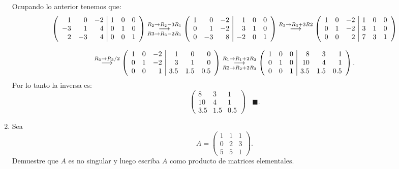 \documentclass[11pt,letterpaper]{article}
\newcommand{\finf}{\blacksquare.}
\newcommand{\grstep}[2][\relax]{%
   \ensuremath{\mathrel{
       {\mathop{\longrightarrow}\limits^{#2\mathstrut}_{
                                     \begin{subarray}{l} #1 \end{subarray}}}}}}
\begin{document}
\begin{enumerate}
Ocupando lo anterior tenemos que:
\begin{equation*}
\begin{array}{c}
\left(\begin{array}{rrr|rrr}
 1 &  0 & -2 & 1 & 0 & 0 \\
-3 &  1 &  4 & 0 & 1 & 0\\
 2 & -3 &  4 & 0 & 0 & 1
\end{array}\right)%
\grstep[R3 \rightarrow R_3 -2R_1]{R_2 \rightarrow R_2 -3R_1}
%
\left(\begin{array}{rrr|rrr}
 1 &  0 & -2 &  1 & 0 & 0\\
 0 &  1 & -2 &  3 & 1 & 0\\
 0 & -3 &  8 & -2 & 0 & 1 
\end{array}\right)%
\grstep[]{R_3 \rightarrow R_3+3R2}
%
\left(\begin{array}{rrr|rrr}
 1 &  0 & -2 &  1 & 0 & 0\\
 0 &  1 & -2 &  3 & 1 & 0\\
 0 &  0 &  2 &  7 & 3 & 1 
\end{array}\right)\\
\\
%
\grstep[]{R_3 \rightarrow R_3/2}
% 
\left(\begin{array}{rrr|rrr}
 1 &  0 & -2 &  1 & 0 & 0\\
 0 &  1 & -2 &  3 & 1 & 0\\
 0 &  0 &  1 &  3.5 & 1.5 & 0.5 
\end{array}\right)%
\grstep[R2 \rightarrow R_2+2R_3]{R_1 \rightarrow R_1+2R_3}
%
\left(\begin{array}{rrr|rrr}
 1 &  0 & 0 &  8 & 3 & 1\\
 0 &  1 & 0 &  10 & 4 & 1\\
 0 &  0 & 1 &  3.5 & 1.5 & 0.5 
\end{array}\right).
\end{array}
\end{equation*}
Por lo tanto la inversa es: 
\begin{equation*}
\begin{pmatrix}
8 & 3 & 1 \\
10 & 4 & 1 \\
3.5 & 1.5 & 0.5
\end{pmatrix} \ \ \ \ \finf
\end{equation*}
\item Sea 
\begin{equation*}
A=\left(\begin{array}{rrr}
 1 & 1 & 1\\
 0 & 2 & 3\\
 5 & 5 & 1
\end{array}\right).
\end{equation*}
Demuestre que $A$ es no singular y luego escriba $A$ como producto de matrices elementales.


\end{enumerate}
\end{document}

